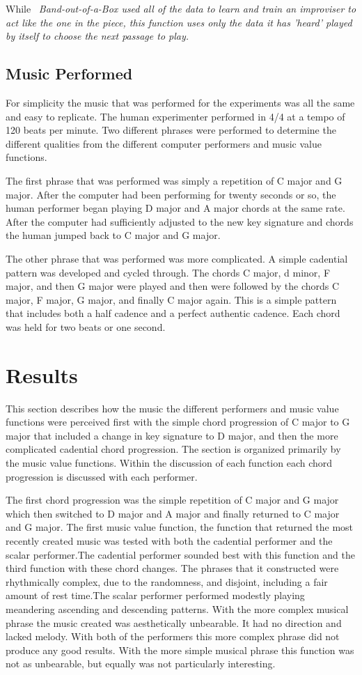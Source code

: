 \documentclass[12pt]{ucthesis}
\begin{document}
While ~\em{Band-out-of-a-Box }\em used all of the data to learn and train an improviser to act like the one in the piece, this function uses only the data it has 'heard' played by itself to choose the next passage to play. 

\section{Music Performed}
\label{music-performed}
For simplicity the music that was performed for the experiments was all the same and easy to replicate. The human experimenter performed in 4/4 at a tempo of 120 beats per minute. Two different phrases were performed to determine the different qualities from the different computer performers and music value functions. 

The first phrase that was performed was simply a repetition of C major and G major. After the computer had been performing for twenty seconds or so, the human performer began playing D major and A major chords at the same rate. After the computer had sufficiently adjusted to the new key signature and chords the human jumped back to C major and G major. 

The other phrase that was performed was more complicated. A simple cadential pattern was developed and cycled through. The chords C major, d minor, F major, and then G major were played and then were followed by the chords C major, F major, G major, and finally C major again. This is a simple pattern that includes both a half cadence and a perfect authentic cadence. Each chord was held for two beats or one second.

\chapter{Results}
\label{results}
This section describes how the music the different performers and music value functions were perceived first with the simple chord progression of C major to G major that included a change in key signature to D major, and then the more complicated cadential chord progression. The section is organized primarily by the music value functions. Within the discussion of each function each chord progression is discussed with each performer. 

The first chord progression was the simple repetition of C major and G major which then switched to D major and A major and finally returned to C major and G major. The first music value function, the function that returned the most recently created music was tested with both the cadential performer and the scalar performer.The cadential performer sounded best with this function and the third function with these chord changes. The phrases that it constructed were rhythmically complex, due to the randomness, and disjoint, including a fair amount of rest time.The scalar performer performed modestly playing meandering ascending and descending patterns. With the more complex musical phrase the music created was aesthetically unbearable. It had no direction and lacked melody. With both of the performers this more complex phrase did not produce any good results. With the more simple musical phrase this function was not as unbearable, but equally was not particularly interesting.
\end{document}
